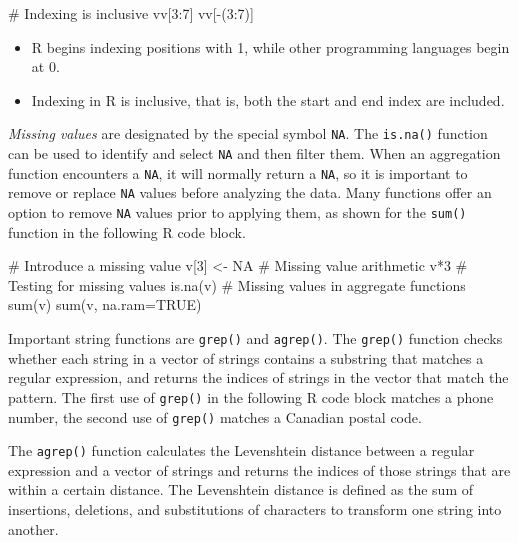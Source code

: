 \begin{Rcode}
# Indexing is inclusive
vv[3:7]
vv[-(3:7)]
\end{Rcode}

\begin{alertbox}
\begin{itemize}
   \item R begins indexing positions with 1, while other programming languages begin at 0.
   \item Indexing in R is inclusive, that is, both the start and end index are included.
\end{itemize}
\end{alertbox}

\emph{Missing values} are designated by the special symbol \texttt{NA}. The \texttt{is.na()} function can be used to identify and select \texttt{NA} and then filter them. When an aggregation function encounters a \texttt{NA}, it will normally return a \texttt{NA}, so it is important to remove or replace \texttt{NA} values before analyzing the data. Many functions offer an option to remove \texttt{NA} values prior to applying them, as shown for the \texttt{sum()} function in the following R code block. 

\begin{Rcode}
# Introduce a missing value
v[3] <- NA
# Missing value arithmetic
v*3
# Testing for missing values
is.na(v)
# Missing values in aggregate functions
sum(v)
sum(v, na.ram=TRUE)
\end{Rcode}

Important string functions are \texttt{grep()} and \texttt{agrep()}. The \texttt{grep()} function checks whether each string in a vector of strings contains a substring that matches a regular expression, and returns the indices of strings in the vector that match the pattern. The first use of \texttt{grep()} in the following R code block matches a phone number, the second use of \texttt{grep()} matches a Canadian postal code.


The \texttt{agrep()} function calculates the Levenshtein distance between a regular expression and a vector of strings and returns the indices of those strings that are within a certain distance. The Levenshtein distance is defined as the sum of insertions, deletions, and substitutions of characters to transform one string into another.

